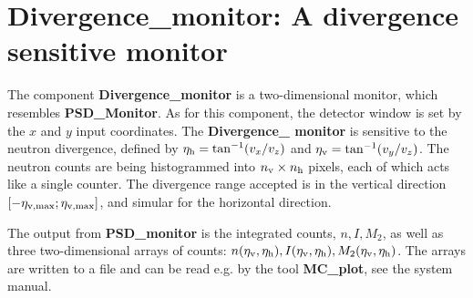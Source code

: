 
\section{Divergence\_monitor: A divergence sensitive monitor}


The component {\bf Divergence\_monitor} is a two-dimensional monitor,
which resembles {\bf PSD\_Monitor}. As for this component,  
the detector window is set
by the $x$ and $y$ input coordinates.
The {\bf Divergence\_ monitor} is sensitive to the neutron divergence,
defined by
$\eta_{\rm h} = \tan^{-1}(v_x/v_z)$ and $\eta_{\rm v} = \tan^{-1}(v_y/v_z)$.
The neutron counts are being histogrammed
into $n_{\rm v} \times n_{\rm h}$ pixels, each of which acts like a single
counter. The divergence range accepted is in the vertical direction
$[-\eta_{\rm v,max}; \eta_{\rm v,max}]$, and simular for the horizontal 
direction.

The output from {\bf PSD\_monitor} is the integrated counts, $n, I, M_2$, 
as well as 
three two-dimensional arrays of counts: $n(\eta_{\rm v},\eta_{\rm h}), 
I(\eta_{\rm v},\eta_{\rm h}), M_2(\eta_{\rm v},\eta_{\rm h})$.
The arrays are written to a file and can be read e.g. by the tool
{\bf MC\_plot}, see the system manual.

